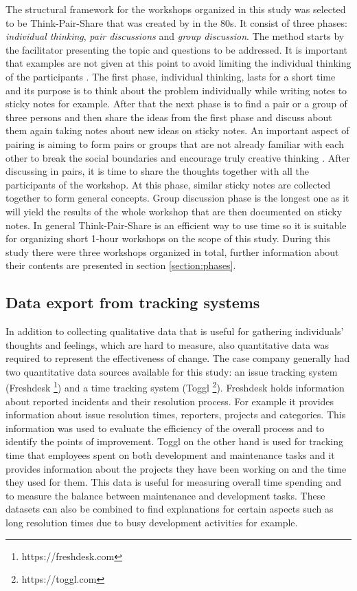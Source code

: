 The structural framework for the workshops organized in this study was selected to be Think-Pair-Share that was created by \citet{Lyman1987} in the 80s. It consist of three
phases: \emph{individual thinking}, \emph{pair discussions} and \emph{group discussion}. The method starts by the facilitator presenting the topic and questions to be addressed.
It is important that examples are not given at this point to avoid limiting the individual thinking of the participants \citep{Lyman1987}. The first phase, individual thinking, lasts
for a short time and its purpose is to think about the problem individually while writing notes to sticky notes for example. After that the next phase is to find a pair
or a group of three persons and then share the ideas from the first phase and discuss about them again taking notes about new ideas on sticky notes. An important aspect of 
pairing is aiming to form pairs or groups that are not already familiar with each other to break the social boundaries and encourage truly creative thinking
\citep{Leondelabarra1997}. After discussing in pairs, it is time to share the thoughts together with all the participants of the workshop. At this phase, similar sticky notes
are collected together to form general concepts. Group discussion phase is the longest one as it will yield the results of the whole workshop that are then documented on
sticky notes. In general Think-Pair-Share is an efficient way to use time so it is suitable for organizing short 1-hour workshops on the scope of this study. During this
study there were three workshops organized in total, further information about their contents are presented in section \ref{section:phases}.

\subsection{Data export from tracking systems}
\label{subsection:export}

In addition to collecting qualitative data that is useful for gathering individuals' thoughts and feelings, which are hard to measure, also quantitative data was required
to represent the effectiveness of change. The case company generally had two quantitative data sources available for this study: an issue tracking system (Freshdesk
\footnote{https://freshdesk.com}) and a time tracking system (Toggl \footnote{https://toggl.com}). Freshdesk holds information about reported incidents and their
resolution process. For example it provides information about issue resolution times, reporters, projects and categories. This information was used to evaluate
the efficiency of the overall process and to identify the points of improvement. Toggl on the other hand is used for tracking time that employees spent on both development and maintenance 
tasks and it provides information about the projects they have been working on and the time they used for them. This data is useful for measuring overall time spending and to
measure the balance between maintenance and development tasks. These datasets can also be combined to find explanations for certain aspects such as long resolution times
due to busy development activities for example.

